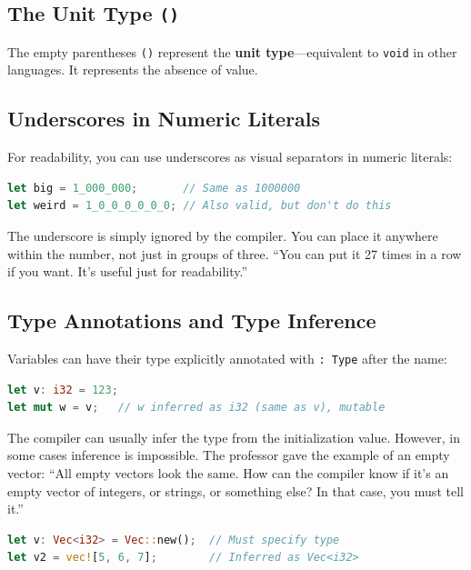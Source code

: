 \subsection{The Unit Type \texttt{()}}

The empty parentheses \texttt{()} represent the \textbf{unit type}---equivalent to \texttt{void} in other languages. It represents the absence of value.

\subsection{Underscores in Numeric Literals}

For readability, you can use underscores as visual separators in numeric literals:

\begin{lstlisting}[language=Rust]
let big = 1_000_000;       // Same as 1000000
let weird = 1_0_0_0_0_0_0; // Also valid, but don't do this
\end{lstlisting}

The underscore is simply ignored by the compiler. You can place it anywhere within the number, not just in groups of three. ``You can put it 27 times in a row if you want. It's useful just for readability.''

\subsection{Type Annotations and Type Inference}

Variables can have their type explicitly annotated with \texttt{: Type} after the name:

\begin{lstlisting}[language=Rust]
let v: i32 = 123;
let mut w = v;   // w inferred as i32 (same as v), mutable
\end{lstlisting}

The compiler can usually infer the type from the initialization value. However, in some cases inference is impossible. The professor gave the example of an empty vector: ``All empty vectors look the same. How can the compiler know if it's an empty vector of integers, or strings, or something else? In that case, you must tell it.''

\begin{lstlisting}[language=Rust]
let v: Vec<i32> = Vec::new();  // Must specify type
let v2 = vec![5, 6, 7];        // Inferred as Vec<i32>
\end{lstlisting}

